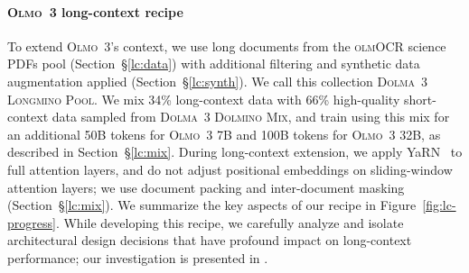\documentclass[table]{ai2style/ai2}
\newcommand{\newOlmo}{Olmo\xspace}
\newcommand{\olmothree}{\textsc{\newOlmo~3}\xspace}
\newcommand{\dolminostoo}{\textsc{Dolma~3 Dolmino Mix}\xspace}
\newcommand{\longminoPool}{\textsc{Dolma~3 Longmino Pool}\xspace}
\newcommand{\olmocr}{\textsc{olmOCR}\xspace}
\newcommand{\olmocrPDF}{{\olmocr science PDFs}\xspace}
\begin{document}
\paragraph{\olmothree long-context recipe}
To extend \olmothree's context, we use long documents from the \olmocrPDF pool (Section~\S\ref{lc:data}) with additional filtering and synthetic data augmentation applied (Section~\S\ref{lc:synth}).
We call this collection \longminoPool{}.
We mix 34\% long-context data with 66\% high-quality short-context data sampled from \dolminostoo{}, and train using this mix for an additional 50B tokens for \olmothree 7B and 100B tokens for \olmothree 32B, as described in Section~\S\ref{lc:mix}.
During long-context extension, we apply YaRN~\citep{peng2023yarnefficientcontextwindow} to full attention layers, and do not adjust positional embeddings on sliding-window attention layers;
we use document packing and inter-document masking (Section~\S\ref{lc:mix}).
We summarize the key aspects of our recipe in Figure~\ref{fig:lc-progress}.
While developing this recipe, we carefully analyze and isolate architectural design decisions that have profound impact on long-context performance; our investigation is presented in \citet{bertsch2026cracks}. 
\end{document}
